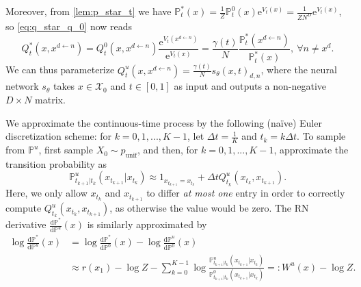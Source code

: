 \documentclass{article}
\theoremstyle{remark}
\newcommand{\e}{\mathrm{e}}
\renewcommand{\P}{\mathbb{P}}
\newcommand{\de}[2]{\frac{\mathrm{d}#1}{\mathrm{d}#2}} %
\newcommand{\cX}{\mathcal{X}}
\newcommand{\punif}{p_\mathrm{unif}}
\begin{document}
%

Moreover, from \cref{lem:p_star_t} we have $\P^*_t(x)=\frac{1}{Z}\P^0_t(x)\e^{V_t(x)}=\frac{1}{ZN^D}\e^{V_t(x)}$, so \cref{eq:q_star_q_0} now reads
$$Q^*_t(x,x^{d\gets n})=Q^0_t(x,x^{d\gets n})\frac{\e^{V_t(x^{d\gets n})}}{\e^{V_t(x)}}=\frac{\gamma(t)}{N}\frac{\P^*_t(x^{d\gets n})}{\P^*_t(x)},~\forall n\ne x^d.$$
We can thus parameterize $Q^u_t(x,x^{d\gets n})=\frac{\gamma(t)}{N}s_\theta(x,t)_{d,n}$, where the neural network $s_\theta$ takes $x\in\cX_0$ and $t\in[0,1]$ as input and outputs a non-negative $D\times N$ matrix.

We approximate the continuous-time process by the following (na\"ive) Euler discretization scheme: for $k=0,1,...,K-1$, let $\Delta t=\frac{1}{K}$ and $t_k=k\Delta t$. To sample from $\P^u$, first sample $X_0\sim\punif$, and then, for $k=0,1,...,K-1$, approximate the transition probability as
$$\P^u_{t_{k+1}|t_k}(x_{t_{k+1}}|x_{t_k})\approx1_{x_{t_{k+1}}=x_{t_k}}+\Delta tQ^u_{t_k}(x_{t_k},x_{t_{k+1}}).$$
Here, we only allow $x_{t_k}$ and $x_{t_{k+1}}$ to differ \textit{at most one} entry in order to correctly compute $Q^u_{t_k}(x_{t_k},x_{t_{k+1}})$, as otherwise the value would be zero. The RN derivative $\de{\P^*}{\P^u}(x)$ is similarly approximated by
\begin{align}
    \log\de{\P^*}{\P^u}(x)&=\log\de{\P^*}{\P^0}(x)-\log\de{\P^u}{\P^0}(x)\nonumber\\
    &\approx r(x_1)-\log Z-\sum_{k=0}^{K-1}\log\frac{\P^u_{t_{k+1}|t_k}(x_{t_{k+1}}|x_{t_k})}{\P^0_{t_{k+1}|t_k}(x_{t_{k+1}}|x_{t_k})}=:W^u(x)-\log Z.\label{eq:rnd_simplified_unif}
\end{align}
\end{document}
